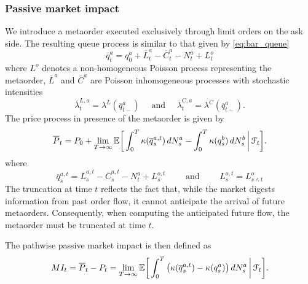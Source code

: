 \documentclass{article} %
\def\wb{\overline}
\newcommand{\1}{\mathbbm{1}} %
\newcommand{\E}{\mathbb{E}}
\begin{document}
\subsubsection{Passive market impact}
We introduce a metaorder executed exclusively through limit orders on the ask side. The resulting queue process is similar to that given by \eqref{eq:bar_queue}
\begin{equation*}
\wb q^a_t = q_0^a + \wb L^{a}_t - \wb C^{a}_t - N^{a}_t + L^{o}_t
\end{equation*}
where $L^o$ denotes a non-homogeneous Poisson process representing the metaorder, $\wb L^{a}$ and $\wb C^{a}$ are Poisson inhomogeneous processes with stochastic intensities
\begin{equation*}
\wb \lambda_t^{L,a} = \lambda^L(\wb q_{t-}^{a})
\quad \text{ and } \quad 
\wb \lambda_t^{C,a} = \lambda^C(\wb q_{t-}^{a}).
\end{equation*}
The price process in presence of the metaorder is given by
\begin{equation}
\label{eq:price:lim:metaorder}
\wb P_t = P_0 + \lim_{T\to\infty}
\E\bigg[\int_0^T \kappa(\wb q^{a,t}_{s}) \, dN^a_s - \int_0^T \kappa(q^b_s) \, dN^b_s \,\bigg | \, \calF_t \bigg].
\end{equation}
where 
\begin{equation*}
\wb q^{a,t}_{s} = \wb L^{a,t}_{s} - \wb C^{a,t}_{s} - N^{a}_t + L_{s}^{o,t}
\quad \quad \text{ and } \quad \quad
 L_{s}^{o,t} = L^{o}_{s \wedge t}
\end{equation*}
The truncation at time $t$ reflects the fact that, while the market digests information from past order flow, it cannot anticipate the arrival of future metaorders. Consequently, when computing the anticipated future flow, the metaorder must be truncated at time $t$. 

The pathwise passive market impact is then defined as
\begin{equation}
\label{eq:mi}
MI_t = \wb P_t - P_t = \lim_{T\to\infty}
\E\bigg[\int_0^T \big( \kappa(\wb q^{a,t}_{s}) - \kappa(q^a_s) \big) \, dN^a_s \,\bigg | \, \calF_t \bigg].
\end{equation}
\end{document}

